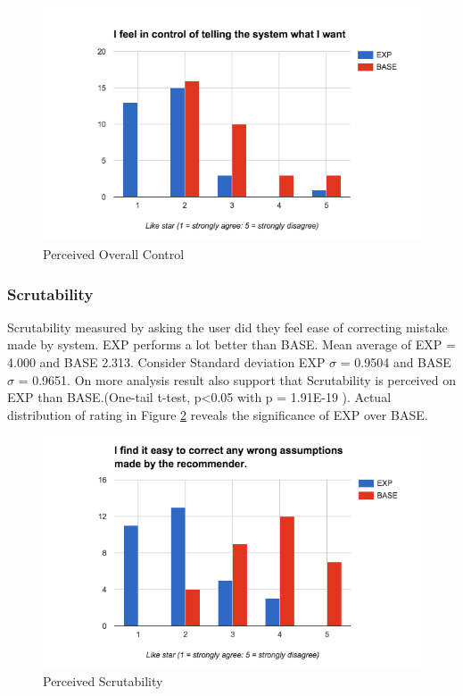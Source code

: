 \begin{figure}[h]
	\centering
	\includegraphics[width= 1\linewidth]{figures/ch5_stat_overall_control}
	\caption{Perceived Overall Control}
	\label{fig:ch5_stat_overall_control}
\end{figure}

\subsubsection{Scrutability}

Scrutability measured by asking the user did they feel ease of correcting mistake made by system. EXP performs a lot better than BASE. Mean average of EXP = 4.000 and BASE 2.313. Consider Standard deviation EXP ${\sigma}$ = 0.9504 and BASE ${\sigma}$ = 0.9651. On more analysis result also support that Scrutability is perceived on EXP than BASE.(One-tail t-test, p<0.05 with p = 1.91E-19
). Actual distribution of rating in Figure \ref{fig:ch5_stat_scrutability} reveals the significance of EXP over BASE.

\begin{figure}[h]
	\centering
	\includegraphics[width= 1\linewidth]{figures/ch5_stat_scrutability}
	\caption{Perceived Scrutability}
	\label{fig:ch5_stat_scrutability}
\end{figure}
\newpage
